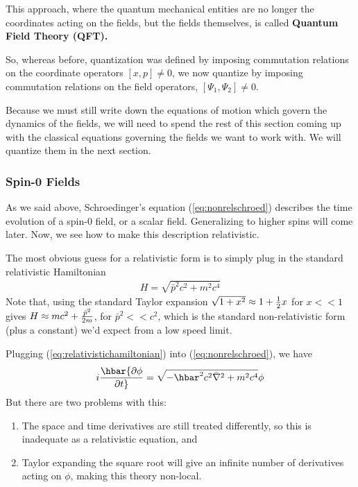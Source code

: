 \documentclass[12pt,epsf]{article}
\def\nolabel{\nonumber }
\def\nolabel{\nonumber }
\begin{document}
This approach, where the quantum mechanical entities are no longer the
coordinates acting on the fields, but the fields themselves, is called
\bf Quantum Field Theory \rm (QFT).  

So, whereas before, quantization was defined by imposing commutation
relations on the coordinate operators $[x,p]\neq0$, we now quantize by
imposing commutation relations on the field operators, $[\Psi_1,\Psi_2]
\neq 0$.  

Because we must still write down the equations of motion which govern
the dynamics of the fields, we will need to spend the rest of this
section coming up with the classical equations governing the fields we
want to work with.  We will quantize them in the next section.

\subsubsection{Spin-0 Fields}
\label{sec:spin0fields}

As we said above, Schroedinger's equation (\ref{eq:nonrelschroed})
describes the time evolution of a spin-0 field, or a scalar field.
Generalizing to higher spins will come later.  Now, we see how
to make this description relativistic.	

The most obvious guess for a relativistic form is to simply plug in the
standard relativistic Hamiltonian
\begin{eqnarray}
H = \sqrt{\bar p^2c^2+m^2c^4} \label{eq:relativistichamiltonian}
\end{eqnarray}
Note that, using the standard Taylor expansion $\sqrt{1+x^2} \approx
1+{1\over 2}x$ for $x<<1$ gives $H \approx mc^2+{\bar p^2 \over 2m}$,
for $\bar p^2 <<c^2$, which is the standard non-relativistic form (plus
a constant) we'd expect from a low speed limit.  

Plugging (\ref{eq:relativistichamiltonian}) into
(\ref{eq:nonrelschroed}), we have
\begin{eqnarray}
i\hbar {\partial \phi \over \partial t} = \sqrt{-\hbar^2 c^2\bar
\nabla^2 + m^2c^4}\phi\nolabel
\end{eqnarray}
But there are two problems with this:
\begin{enumerate}
\item The space and time derivatives are still treated
differently, so this is inadequate as a relativistic equation, and
\item Taylor expanding the square root will give an infinite
number of derivatives acting on $\phi$, making this theory non-local.  
\end{enumerate}
\end{document}
